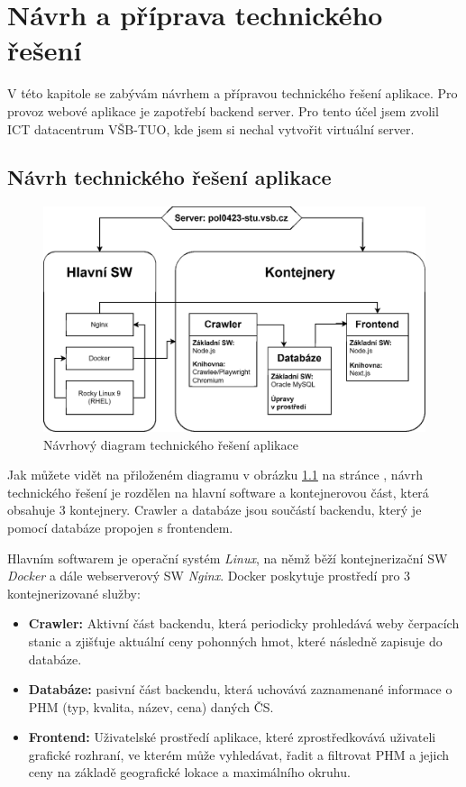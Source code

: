 \chapter{Návrh a příprava technického řešení}
\label{ch:design-and-prepaparions}

V této kapitole se zabývám návrhem a přípravou technického řešení
aplikace. Pro provoz webové aplikace je zapotřebí backend server.
Pro tento účel jsem zvolil ICT datacentrum VŠB-TUO, kde jsem si nechal
vytvořit virtuální server.

\section{Návrh technického řešení aplikace}
\label{sec:technical-design}

\begin{figure}
    \centering
    \includegraphics[width=0.75\linewidth]{Figures/structure.eps}
    \caption{Návrhový diagram technického řešení aplikace}
    \label{fig:structure-diagram}
\end{figure}

Jak můžete vidět na přiloženém diagramu v obrázku \ref{fig:structure-diagram}
na stránce \pageref{fig:structure-diagram}, návrh technického řešení
je rozdělen na hlavní software a kontejnerovou část, která obsahuje
3 kontejnery. Crawler a databáze jsou součástí backendu, který je pomocí
databáze propojen s frontendem.

Hlavním softwarem je operační systém \emph{Linux}, na němž běží
kontejnerizační SW \emph{Docker} a dále webserverový SW \emph{Nginx}.
Docker poskytuje prostředí pro 3 kontejnerizované služby:

\begin{itemize}
    \item \textbf{Crawler:} Aktivní část backendu, která periodicky
        prohledává weby čerpacích stanic a zjišťuje aktuální ceny
        pohonných hmot, které následně zapisuje do databáze.
    \item \textbf{Databáze:} pasivní část backendu, která uchovává
        zaznamenané informace o PHM (typ, kvalita, název, cena)
        daných ČS.
    \item \textbf{Frontend:} Uživatelské prostředí aplikace, které
        zprostředkovává uživateli grafické rozhraní, ve kterém může
        vyhledávat, řadit a filtrovat PHM a jejich ceny na základě
        geografické lokace a maximálního okruhu.
\end{itemize}

